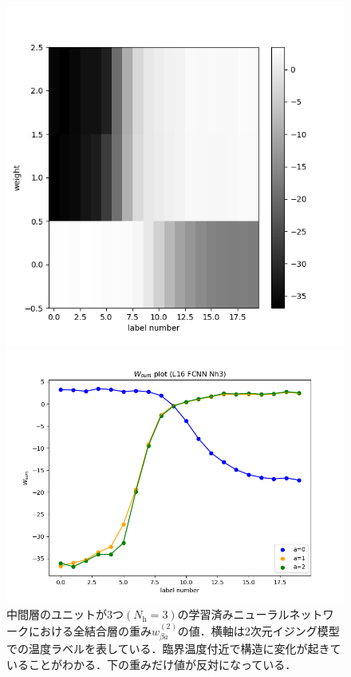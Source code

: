 \documentclass[a4paper,11pt]{jsreport}
\begin{document}
\begin{figure}[H]
  \begin{minipage}[b]{0.45\linewidth}
    \begin{center}
      \includegraphics[keepaspectratio, scale=0.4]{image/温度測定器2_L16_FCN_Nh3_pram.png}
    \end{center}
  \end{minipage}
  \begin{minipage}[b]{0.45\linewidth}
    \begin{center}
      \includegraphics[keepaspectratio, scale=0.4]{image/温度測定器2_L16_FCN_Nh3_weight_plot.png}
    \end{center}
  \end{minipage}
  \caption{中間層のユニットが3つ$(N_{\text{h}}=3)$の学習済みニューラルネットワークにおける全結合層の重み$w_{\beta a}^{(2)}$の値．横軸は2次元イジング模型での温度ラベルを表している．臨界温度付近で構造に変化が起きていることがわかる．下の重みだけ値が反対になっている．}
  \label{温度測定器FCN2重みプロット}
\end{figure}
\end{document}

